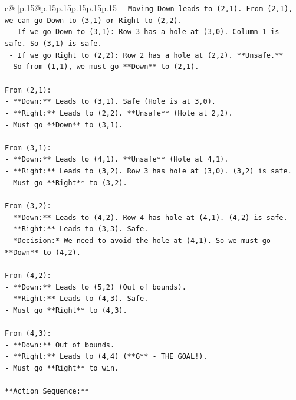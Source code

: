 \documentclass{article}
\begin{document}
{\begin{supertabular}{c@{$\;$}|p{.15\linewidth}@{}p{.15\linewidth}p{.15\linewidth}p{.15\linewidth}p{.15\linewidth}p{.15\linewidth}}
{{{\texttt{{-} Moving Down leads to (2,1). From (2,1), we can go Down to (3,1) or Right to (2,2).} \\
\texttt{  {-} If we go Down to (3,1): Row 3 has a hole at (3,0). Column 1 is safe. So (3,1) is safe.} \\
\texttt{  {-} If we go Right to (2,2): Row 2 has a hole at (2,2). **Unsafe.**} \\
\texttt{{-} So from (1,1), we must go **Down** to (2,1).} \\
\\ 
\texttt{From (2,1):} \\
\texttt{{-} **Down:** Leads to (3,1). Safe (Hole is at 3,0).} \\
\texttt{{-} **Right:** Leads to (2,2). **Unsafe** (Hole at 2,2).} \\
\texttt{{-} Must go **Down** to (3,1).} \\
\\ 
\texttt{From (3,1):} \\
\texttt{{-} **Down:** Leads to (4,1). **Unsafe** (Hole at 4,1).} \\
\texttt{{-} **Right:** Leads to (3,2). Row 3 has hole at (3,0). (3,2) is safe.} \\
\texttt{{-} Must go **Right** to (3,2).} \\
\\ 
\texttt{From (3,2):} \\
\texttt{{-} **Down:** Leads to (4,2). Row 4 has hole at (4,1). (4,2) is safe.} \\
\texttt{{-} **Right:** Leads to (3,3). Safe.} \\
\texttt{{-} *Decision:* We need to avoid the hole at (4,1). So we must go **Down** to (4,2).} \\
\\ 
\texttt{From (4,2):} \\
\texttt{{-} **Down:** Leads to (5,2) (Out of bounds).} \\
\texttt{{-} **Right:** Leads to (4,3). Safe.} \\
\texttt{{-} Must go **Right** to (4,3).} \\
\\ 
\texttt{From (4,3):} \\
\texttt{{-} **Down:** Out of bounds.} \\
\texttt{{-} **Right:** Leads to (4,4) (**G** {-} THE GOAL!).} \\
\texttt{{-} Must go **Right** to win.} \\
\\ 
\texttt{**Action Sequence:**} \\
}}}
\end{supertabular}}
\end{document}

